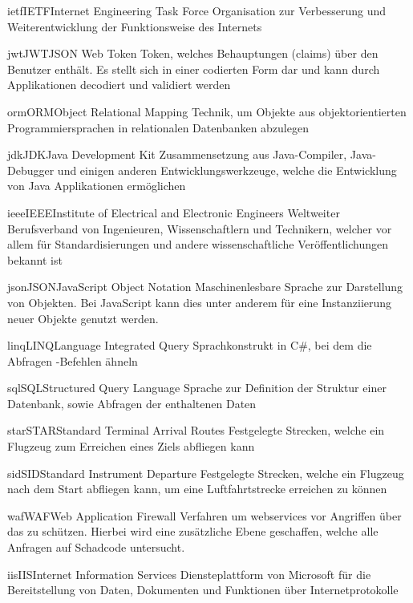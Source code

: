 \newdefineabbreviation
{ietf}{IETF}{Internet Engineering Task Force}
{Organisation zur Verbesserung und Weiterentwicklung der Funktionsweise des Internets}

\newdefineabbreviation
{jwt}{JWT}{JSON Web Token}
{Token, welches Behauptungen (claims) über den Benutzer enthält.
Es stellt sich in einer codierten Form dar und kann durch Applikationen decodiert und validiert werden}

\newdefineabbreviation
{orm}{ORM}{Object Relational Mapping}
{Technik, um Objekte aus objektorientierten Programmiersprachen in relationalen Datenbanken abzulegen}

\newdefineabbreviation
{jdk}{JDK}{Java Development Kit}
{Zusammensetzung aus Java-Compiler, Java-Debugger und einigen anderen Entwicklungswerkzeuge,
	welche die Entwicklung von Java Applikationen ermöglichen}

\newdefineabbreviation
{ieee}{IEEE}{Institute of Electrical and Electronic Engineers}
{Weltweiter Berufsverband von Ingenieuren, Wissenschaftlern und Technikern,
	welcher vor allem für Standardisierungen und andere wissenschaftliche Veröffentlichungen bekannt ist}

\newdefineabbreviation
{json}{JSON}{JavaScript Object Notation}
{Maschinenlesbare Sprache zur Darstellung von Objekten.
Bei JavaScript kann dies unter anderem für eine
Instanziierung neuer Objekte genutzt werden.}

\newdefineabbreviation
{linq}{LINQ}{Language Integrated Query}
{Sprachkonstrukt in C\#, bei dem die Abfragen -Befehlen ähneln}

\newdefineabbreviation
{sql}{SQL}{Structured Query Language}
{Sprache zur Definition der Struktur einer Datenbank,
	sowie Abfragen der enthaltenen Daten}

\newdefineabbreviation
{star}{STAR}{Standard Terminal Arrival Routes}
{Festgelegte Strecken,
	welche ein Flugzeug zum Erreichen eines Ziels abfliegen kann}

\newdefineabbreviation
{sid}{SID}{Standard Instrument Departure}
{Festgelegte Strecken,
	welche ein Flugzeug nach dem Start abfliegen kann,
	um eine Luftfahrtstrecke erreichen zu können}

\newdefineabbreviation
{waf}{WAF}{Web Application Firewall}
{Verfahren um \glspl{webservice} vor Angriffen über das  zu schützen.
Hierbei wird eine zusätzliche Ebene geschaffen,
	welche alle Anfragen auf Schadcode untersucht.}

\newdefineabbreviation
{iis}{IIS}{Internet Information Services}
{Diensteplattform von Microsoft für die Bereitstellung von Daten,
	Dokumenten und Funktionen über Internetprotokolle}

